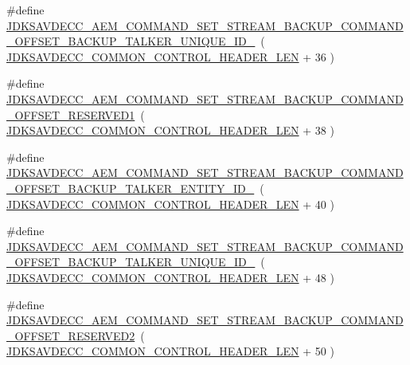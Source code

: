\begin{DoxyCompactItemize}
\item 
\#define \hyperlink{group__command__set__stream__backup_gaa0ee6bbc764773fa469ff7783388160b}{J\+D\+K\+S\+A\+V\+D\+E\+C\+C\+\_\+\+A\+E\+M\+\_\+\+C\+O\+M\+M\+A\+N\+D\+\_\+\+S\+E\+T\+\_\+\+S\+T\+R\+E\+A\+M\+\_\+\+B\+A\+C\+K\+U\+P\+\_\+\+C\+O\+M\+M\+A\+N\+D\+\_\+\+O\+F\+F\+S\+E\+T\+\_\+\+B\+A\+C\+K\+U\+P\+\_\+\+T\+A\+L\+K\+E\+R\+\_\+\+U\+N\+I\+Q\+U\+E\+\_\+\+I\+D\+\_}~( \hyperlink{group__jdksavdecc__avtp__common__control__header_gaae84052886fb1bb42f3bc5f85b741dff}{J\+D\+K\+S\+A\+V\+D\+E\+C\+C\+\_\+\+C\+O\+M\+M\+O\+N\+\_\+\+C\+O\+N\+T\+R\+O\+L\+\_\+\+H\+E\+A\+D\+E\+R\+\_\+\+L\+EN} + 36 )
\item 
\#define \hyperlink{group__command__set__stream__backup_ga7632671e6fa879a439107aa46f7eac84}{J\+D\+K\+S\+A\+V\+D\+E\+C\+C\+\_\+\+A\+E\+M\+\_\+\+C\+O\+M\+M\+A\+N\+D\+\_\+\+S\+E\+T\+\_\+\+S\+T\+R\+E\+A\+M\+\_\+\+B\+A\+C\+K\+U\+P\+\_\+\+C\+O\+M\+M\+A\+N\+D\+\_\+\+O\+F\+F\+S\+E\+T\+\_\+\+R\+E\+S\+E\+R\+V\+E\+D1}~( \hyperlink{group__jdksavdecc__avtp__common__control__header_gaae84052886fb1bb42f3bc5f85b741dff}{J\+D\+K\+S\+A\+V\+D\+E\+C\+C\+\_\+\+C\+O\+M\+M\+O\+N\+\_\+\+C\+O\+N\+T\+R\+O\+L\+\_\+\+H\+E\+A\+D\+E\+R\+\_\+\+L\+EN} + 38 )
\item 
\#define \hyperlink{group__command__set__stream__backup_ga1a7026d5edab43a8eb0abc8a89a3d1c3}{J\+D\+K\+S\+A\+V\+D\+E\+C\+C\+\_\+\+A\+E\+M\+\_\+\+C\+O\+M\+M\+A\+N\+D\+\_\+\+S\+E\+T\+\_\+\+S\+T\+R\+E\+A\+M\+\_\+\+B\+A\+C\+K\+U\+P\+\_\+\+C\+O\+M\+M\+A\+N\+D\+\_\+\+O\+F\+F\+S\+E\+T\+\_\+\+B\+A\+C\+K\+U\+P\+\_\+\+T\+A\+L\+K\+E\+R\+\_\+\+E\+N\+T\+I\+T\+Y\+\_\+\+I\+D\+\_}~( \hyperlink{group__jdksavdecc__avtp__common__control__header_gaae84052886fb1bb42f3bc5f85b741dff}{J\+D\+K\+S\+A\+V\+D\+E\+C\+C\+\_\+\+C\+O\+M\+M\+O\+N\+\_\+\+C\+O\+N\+T\+R\+O\+L\+\_\+\+H\+E\+A\+D\+E\+R\+\_\+\+L\+EN} + 40 )
\item 
\#define \hyperlink{group__command__set__stream__backup_ga0cd638e412225199e4bb2595cd4517d6}{J\+D\+K\+S\+A\+V\+D\+E\+C\+C\+\_\+\+A\+E\+M\+\_\+\+C\+O\+M\+M\+A\+N\+D\+\_\+\+S\+E\+T\+\_\+\+S\+T\+R\+E\+A\+M\+\_\+\+B\+A\+C\+K\+U\+P\+\_\+\+C\+O\+M\+M\+A\+N\+D\+\_\+\+O\+F\+F\+S\+E\+T\+\_\+\+B\+A\+C\+K\+U\+P\+\_\+\+T\+A\+L\+K\+E\+R\+\_\+\+U\+N\+I\+Q\+U\+E\+\_\+\+I\+D\+\_}~( \hyperlink{group__jdksavdecc__avtp__common__control__header_gaae84052886fb1bb42f3bc5f85b741dff}{J\+D\+K\+S\+A\+V\+D\+E\+C\+C\+\_\+\+C\+O\+M\+M\+O\+N\+\_\+\+C\+O\+N\+T\+R\+O\+L\+\_\+\+H\+E\+A\+D\+E\+R\+\_\+\+L\+EN} + 48 )
\item 
\#define \hyperlink{group__command__set__stream__backup_ga13cc3a8bb115d651618a7f2ec48b91c7}{J\+D\+K\+S\+A\+V\+D\+E\+C\+C\+\_\+\+A\+E\+M\+\_\+\+C\+O\+M\+M\+A\+N\+D\+\_\+\+S\+E\+T\+\_\+\+S\+T\+R\+E\+A\+M\+\_\+\+B\+A\+C\+K\+U\+P\+\_\+\+C\+O\+M\+M\+A\+N\+D\+\_\+\+O\+F\+F\+S\+E\+T\+\_\+\+R\+E\+S\+E\+R\+V\+E\+D2}~( \hyperlink{group__jdksavdecc__avtp__common__control__header_gaae84052886fb1bb42f3bc5f85b741dff}{J\+D\+K\+S\+A\+V\+D\+E\+C\+C\+\_\+\+C\+O\+M\+M\+O\+N\+\_\+\+C\+O\+N\+T\+R\+O\+L\+\_\+\+H\+E\+A\+D\+E\+R\+\_\+\+L\+EN} + 50 )

\end{DoxyCompactItemize}
